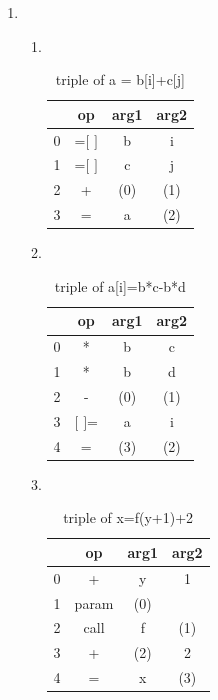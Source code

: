 \documentclass[12pt,a4paper]{article}
\makeatletter
\newtheorem*{solution}{Solution}
\renewenvironment{solution}[1][Solution] {\par\pushQED{\qed}\normalfont\topsep6\p@\@plus6\p@\relax\trivlist\item[\hskip\labelsep\bfseries#1\@addpunct{.}]\ignorespaces}{\popQED\endtrivlist\@endpefalse} \makeatother
\makeatother
\begin{document}
\begin{enumerate}
\begin{solution}
\textrm{\\}
  \begin{enumerate}
    \item 
    \textrm{\\}
    \begin{table}[h]
    \centering
    \begin{tabular}{|c|c|c|c|}
    \hline
     & op & arg1 & arg2\\
    \hline
    0 & =$[$ $]$ & b & i\\
    \hline
    1 & =$[$ $]$ & c & j\\
    \hline
    2 & + & (0) & (1)\\
    \hline
    3 & = & a & (2)\\
    \hline
    \end{tabular}
    \caption{triple of a = b[i]+c[j]}
    \end{table}
    \newpage
    \item
    \textrm{\\}
    \begin{table}[h]
    \centering
    \begin{tabular}{|c|c|c|c|}
    \hline
     & op & arg1 & arg2\\
    \hline
    0 & * & b & c\\
    \hline
    1 & * & b & d\\
    \hline
    2 & - & (0) & (1)\\
    \hline
    3 & $[$ $]$= & a & i\\
    \hline
    4 & = & (3) & (2)\\
    \hline 
    \end{tabular}
    \caption{triple of a[i]=b*c-b*d}
    \end{table}

    \item 
    \textrm{\\}
    \begin{table}[h]
    \centering
    \begin{tabular}{|c|c|c|c|}
    \hline
     & op & arg1 & arg2\\
    \hline
    0 & + & y & 1\\
    \hline
    1 & param & (0) &  \\
    \hline
    2 & call & f & (1)\\
    \hline
    3 & + & (2) & 2\\
    \hline
    4 & = & x & (3)\\
    \hline 
    \end{tabular}
    \caption{triple of x=f(y+1)+2}
    \end{table}


\end{enumerate}
\end{solution}
\end{enumerate}
\end{document}
